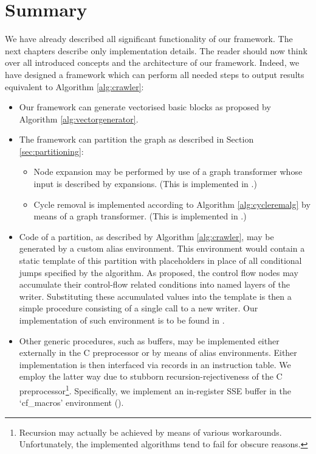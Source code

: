 \section{Summary}

We have already described all significant functionality of our framework. The next chapters describe only implementation details. The reader should now think over all introduced concepts and the architecture of our framework. Indeed, we have designed a framework which can perform all needed steps to output results equivalent to Algorithm \ref{alg:crawler}:
\begin{itemize}
  \item Our framework can generate vectorised basic blocks as proposed by Algorithm \ref{alg:vectorgenerator}.
  \item The framework can partition the graph as described in Section \ref{sec:partitioning}:
  \begin{itemize}
    \item Node expansion may be performed by use of a graph transformer whose input is described by expansions. (This is implemented in .)
    \item Cycle removal is implemented according to Algorithm \ref{alg:cycleremalg} by means of a graph transformer. (This is implemented in .)
  \end{itemize}
\item Code of a partition, as described by Algorithm \ref{alg:crawler}, may be generated by a custom alias environment. This environment would contain a static template of this partition with placeholders in place of all conditional jumps specified by the algorithm. As proposed, the control flow nodes may accumulate their control-flow related conditions into named layers of the writer. Substituting these accumulated values into the template is then a simple procedure consisting of a single call to a new writer. Our implementation of such environment is to be found in .
\item Other generic procedures, such as buffers, may be implemented either externally in the C preprocessor or by means of alias environments. Either implementation is then interfaced via records in an instruction table. We employ the latter way due to stubborn recursion-rejectiveness of the C preprocessor\footnote{Recursion may actually be achieved by means of various workarounds. Unfortunately, the implemented algorithms tend to fail for obscure reasons.}. Specifically, we implement an in-register SSE buffer in the `cf\_macros' environment ().
\end{itemize}
